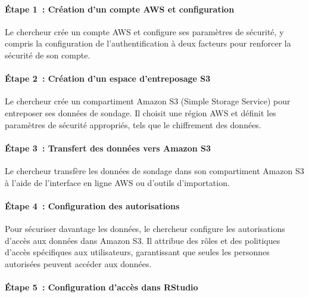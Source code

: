 \documentclass[
  letterpaper,
]{scrbook}
\let\oldparagraph\paragraph
\renewcommand{\paragraph}[1]{\oldparagraph{#1}\mbox{}}
\begin{document}
\hypertarget{uxe9tape-1-cruxe9ation-dun-compte-aws-et-configuration}{%
\paragraph{Étape 1~: Création d'un compte AWS et
configuration}\label{uxe9tape-1-cruxe9ation-dun-compte-aws-et-configuration}}

Le chercheur crée un compte AWS et configure ses paramètres de sécurité,
y compris la configuration de l'authentification à deux facteurs pour
renforcer la sécurité de son compte.

\hypertarget{uxe9tape-2-cruxe9ation-dun-espace-dentreposage-s3}{%
\paragraph{Étape 2~: Création d'un espace d'entreposage
S3}\label{uxe9tape-2-cruxe9ation-dun-espace-dentreposage-s3}}

Le chercheur crée un compartiment Amazon S3 (Simple Storage Service)
pour entreposer ses données de sondage. Il choisit une région AWS et
définit les paramètres de sécurité appropriés, tels que le chiffrement
des données.

\hypertarget{uxe9tape-3-transfert-des-donnuxe9es-vers-amazon-s3}{%
\paragraph{Étape 3~: Transfert des données vers Amazon
S3}\label{uxe9tape-3-transfert-des-donnuxe9es-vers-amazon-s3}}

Le chercheur transfère les données de sondage dans son compartiment
Amazon S3 à l'aide de l'interface en ligne AWS ou d'outils
d'importation.

\hypertarget{uxe9tape-4-configuration-des-autorisations}{%
\paragraph{Étape 4~: Configuration des
autorisations}\label{uxe9tape-4-configuration-des-autorisations}}

Pour sécuriser davantage les données, le chercheur configure les
autorisations d'accès aux données dans Amazon S3. Il attribue des rôles
et des politiques d'accès spécifiques aux utilisateurs, garantissant que
seules les personnes autorisées peuvent accéder aux données.

\hypertarget{uxe9tape-5-configuration-daccuxe8s-dans-rstudio}{%
\paragraph{Étape 5~: Configuration d'accès dans
RStudio}\label{uxe9tape-5-configuration-daccuxe8s-dans-rstudio}}
\end{document}
